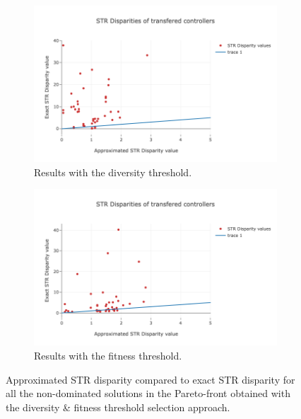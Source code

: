 \begin{figure}[H]
    \centering
    \begin{subfigure}[b]{0.8\textwidth}
    	\centering
        \includegraphics[width=10cm]{include/images/moea_worst_hofs.PNG}
        \caption{Results with the diversity threshold.}
        \label{fig:bad_str_disparity}
    \end{subfigure}
    \begin{subfigure}[b]{0.8\textwidth}
    	\centering
        \includegraphics[width=10cm]{include/images/moea_best_hofs.PNG}
        \caption{Results with the fitness threshold.}
        \label{fig:good_str_disparity}
    \end{subfigure}
    \caption{Approximated STR disparity compared to exact STR disparity for all the non-dominated solutions in the Pareto-front obtained with the diversity & fitness threshold selection approach.}
	\label{fig:str_disparities}
\end{figure}

